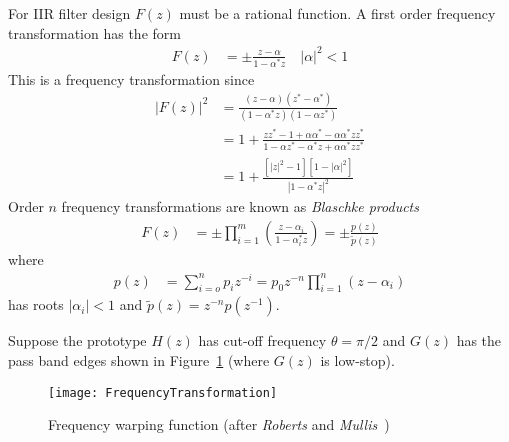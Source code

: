 \documentclass[a4paper,twoside,10pt,english]{report}
\begin{document}
For IIR filter design $F\left(z\right)$ must be a rational function.
A first order frequency transformation has the form
\begin{align*}
F\left(z\right) &= \pm\frac{z-\alpha}{1-\alpha^{*}z}\quad\left|\alpha\right|^{2}<1
\end{align*}
This is a frequency transformation since
\begin{align*}
\left|F\left(z\right)\right|^{2} &= \frac{\left(z-\alpha\right)\left(z^{*}-\alpha^{*}\right)}{\left(1-\alpha^{*}z\right)\left(1-\alpha z^{*}\right)}\\
 &= 1+\frac{zz^{*}-1+\alpha\alpha^{*}-\alpha\alpha^{*}zz^{*}}{1-\alpha z^{*}-\alpha^{*}z+\alpha\alpha^{*}zz^{*}}\\
 &= 1+\frac{\left[\left|z\right|^{2}-1\right]\left[1-\left|\alpha\right|^{2}\right]}{\left|1-\alpha^{*}z\right|^{2}}
\end{align*}
Order $n$ frequency transformations are known as \emph{Blaschke products}
\begin{align*}
F\left(z\right) &= \pm\prod_{i=1}^{m}\left(\frac{z-\alpha_{i}}{1-\alpha_{i}^{*}z}\right)=\pm\frac{p\left(z\right)}{\tilde{p}\left(z\right)}
\end{align*}
where
\begin{align*}
p\left(z\right) &= \sum_{i=o}^{n}p_{i}z^{-i}=p_{0}z^{-n}\prod_{i=1}^{n}\left(z-\alpha_{i}\right)
\end{align*}
has roots $\left|\alpha_{i}\right|<1$ and $\tilde{p}\left(z\right)=z^{-n}p\left(z^{-1}\right)$.

Suppose the prototype $H\left(z\right)$ has cut-off frequency $\theta=\pi/2$
and $G\left(z\right)$ has the pass band edges shown in 
Figure~\ref{fig:Frequency-warping-function}
(where $G\left(z\right)$ is low-stop). 
\begin{figure}[!htbp]
\begin{center}
\texttt{[image: FrequencyTransformation]}
\caption{\label{fig:Frequency-warping-function}Frequency warping function
(after \emph{Roberts} and \emph{Mullis}~\cite[Figure 6.7.2]
{RobertsMullis_DigitalSignalProcessing})}
\end{center}
\end{figure}
\end{document}

